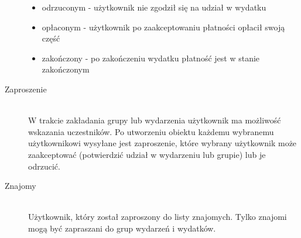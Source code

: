 \begin{description}
\begin{itemize}
    \item odrzuconym - użytkownik nie zgodził się na udział w wydatku
    \item opłaconym - użytkownik po zaakceptowaniu płatności opłacił swoją część
    \item zakończony - po zakończeniu wydatku płatność jest w stanie zakończonym
  \end{itemize}
\item[Zaproszenie] \hfill \\ W trakcie zakładania grupy lub wydarzenia użytkownik ma możliwość wskazania uczestników. Po utworzeniu obiektu każdemu wybranemu użytkownikowi wysyłane jest zaproszenie, które wybrany użytkownik może zaakceptować (potwierdzić udział w wydarzeniu lub grupie) lub je odrzucić.
\item[Znajomy] \hfill \\ Użytkownik, który został zaproszony do listy znajomych. Tylko znajomi mogą być zapraszani do grup wydarzeń i wydatków.
\end{description}


